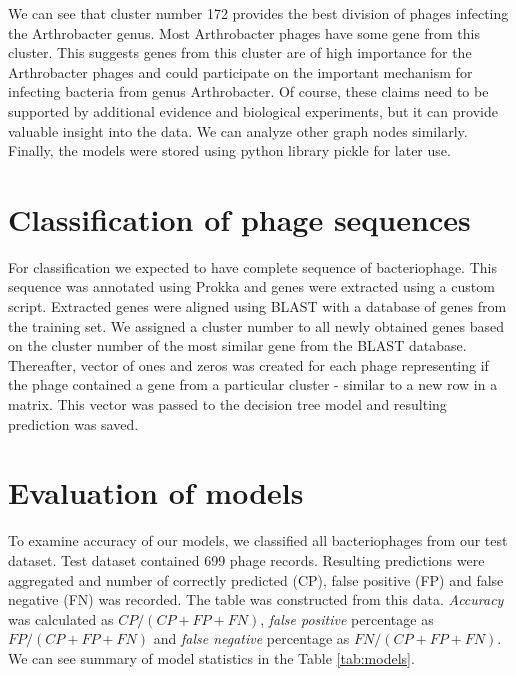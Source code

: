 We can see that cluster number 172 provides the best division of phages infecting the Arthrobacter genus.
Most Arthrobacter phages have some gene from this cluster.
This suggests genes from this cluster are of high importance for the Arthrobacter phages and could participate on the important mechanism for infecting bacteria from genus Arthrobacter.
Of course, these claims need to be supported by additional evidence and biological experiments, but it can provide valuable insight into the data.
We can analyze other graph nodes similarly.
Finally, the models were stored using python library pickle for later use.


\section{Classification of phage sequences}
For classification we expected to have complete sequence of bacteriophage.
This sequence was annotated using Prokka and genes were extracted using a custom script.
Extracted genes were aligned using BLAST with a database of genes from the training set.
We assigned a cluster number to all newly obtained genes based on the cluster number of the most similar gene from the BLAST database.
Thereafter, vector of ones and zeros was created for each phage representing if  the phage contained a gene from a particular cluster - similar to a new row in a matrix.
This vector was passed to the decision tree model and resulting prediction was saved.

\section{Evaluation of models}
To examine accuracy of our models, we classified all bacteriophages from our test dataset.
Test dataset contained 699 phage records.
Resulting predictions were aggregated and number of correctly predicted (CP), false positive (FP) and false negative (FN) was recorded.
The table was constructed from this data.
\emph{Accuracy} was calculated as $CP/(CP+FP+FN)$, \emph{false positive} percentage as $FP/(CP+FP+FN)$ and \emph{false negative} percentage as $FN/(CP+FP+FN)$.
We can see summary of model statistics in the Table \ref{tab:models}.


